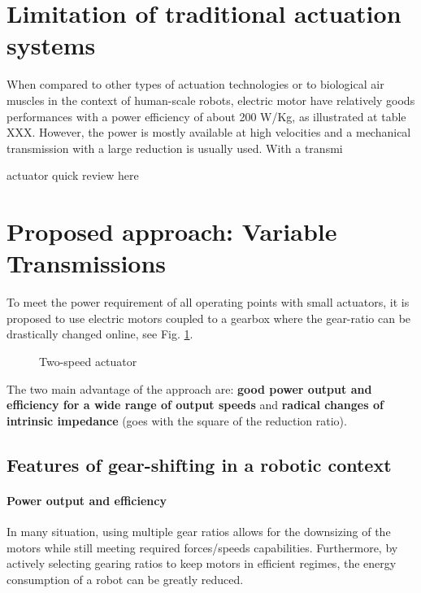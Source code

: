 \section{Limitation of traditional actuation systems}
\label{sec:limitationOfTraditionnalRoboticSystems}

When compared to other types of actuation technologies or to biological air muscles in the context of human-scale robots, electric motor have relatively goods performances with a power efficiency of about 200 W/Kg, as illustrated at table XXX. However, the power is mostly available at high velocities and a mechanical transmission with a large reduction is usually used. With a transmi

actuator quick review here


\section{Proposed approach: Variable Transmissions}
\label{sec:ProposedSolutionRobotsUsingMultipleGearRatioActuators}


To meet the power requirement of all operating points with small actuators, it is proposed to use electric motors coupled to a gearbox where the gear-ratio can be drastically changed online, see Fig. \ref{fig:2s}. 

\begin{figure}[htb]
        \centering
        \caption{Two-speed actuator}\label{fig:2s}
\end{figure}


The two main advantage of the approach are: \textbf{good power output and efficiency for a wide range of output speeds} and \textbf{radical changes of intrinsic impedance} (goes with the square of the reduction ratio). 

\subsection{Features of gear-shifting in a robotic context}

\paragraph{Power output and efficiency}
In many situation, using multiple gear ratios allows for the downsizing of the motors while still meeting required forces/speeds capabilities. Furthermore, by actively selecting gearing ratios to keep motors in efficient regimes, the energy consumption of a robot can be greatly reduced. 

